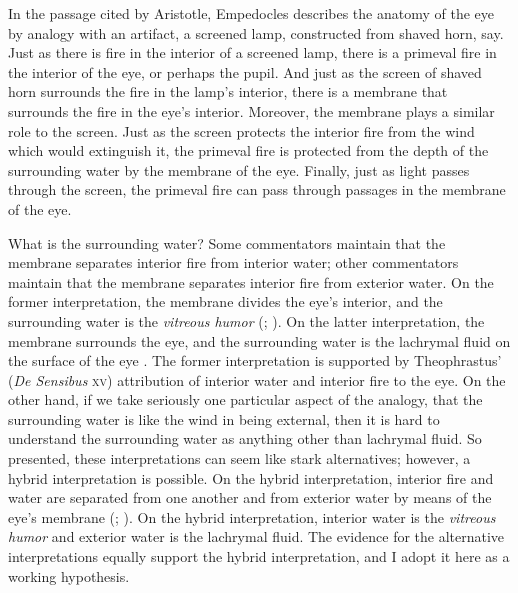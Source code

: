 In the passage cited by Aristotle, Empedocles describes the anatomy of the eye by analogy with an artifact, a screened lamp, constructed from shaved horn, say. Just as there is fire in the interior of a screened lamp, there is a primeval fire in the interior of the eye, or perhaps the pupil. And just as the screen of shaved horn surrounds the fire in the lamp's interior, there is a membrane that surrounds the fire in the eye's interior. Moreover, the membrane plays a similar role to the screen. Just as the screen protects the interior fire from the wind which would extinguish it, the primeval fire is protected from the depth of the surrounding water by the membrane of the eye. Finally, just as light passes through the screen, the primeval fire can pass through passages in the membrane of the eye. 

What is the surrounding water? Some commentators maintain that the membrane separates interior fire from interior water; other commentators maintain that the membrane separates interior fire from exterior water. On the former interpretation, the membrane divides the eye's interior, and the surrounding water is the \emph{vitreous humor} (\citealt[16]{Beare:1906uq}; \citealt[241--242]{Wright:1981zr}). On the latter interpretation, the membrane surrounds the eye, and the surrounding water is the lachrymal fluid on the surface of the eye \citep{Sedley:1992uq}. The former interpretation is supported by Theophrastus' (\emph{De Sensibus} \textsc{xv}) attribution of interior water and interior fire to the eye. On the other hand, if we take seriously one particular aspect of the analogy, that the surrounding water is like the wind in being external, then it is hard to understand the surrounding water as anything other than lachrymal fluid. So presented, these interpretations can seem like stark alternatives; however, a hybrid interpretation is possible. On the hybrid interpretation, interior fire and water are separated from one another and from exterior water by means of the eye's membrane (\citealt[326]{Lloyd:1966ly}; \citealt[26 n39]{Ierodiakonou:2005fk}). On the hybrid interpretation, interior water is the \emph{vitreous humor} and exterior water is the lachrymal fluid. The evidence for the alternative interpretations equally support the hybrid interpretation, and I adopt it here as a working hypothesis.


